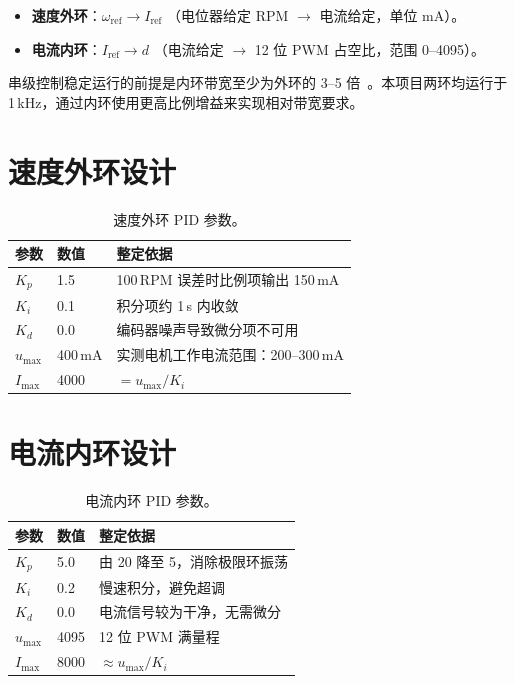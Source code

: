 \documentclass[12pt, a4paper]{ctexrep}
\begin{document}
\begin{itemize}
    \item \textbf{速度外环}：$\omega_{\text{ref}} \to I_{\text{ref}}$
    （电位器给定 RPM $\to$ 电流给定，单位 mA）。
    \item \textbf{电流内环}：$I_{\text{ref}} \to d$
    （电流给定 $\to$ 12 位 PWM 占空比，范围 0--4095）。
\end{itemize}

串级控制稳定运行的前提是内环带宽至少为外环的 3--5 倍~\cite{astrom2006}。本项目两环均运行于 1\,kHz，通过内环使用更高比例增益来实现相对带宽要求。

\section{速度外环设计}

\begin{table}[H]
    \centering
    \caption{速度外环 PID 参数。}
    \label{tab:speed_pid}
    \begin{tabular}{lll}
        \toprule
        \textbf{参数} & \textbf{数值} & \textbf{整定依据} \\
        \midrule
        $K_p$ & 1.5  & 100\,RPM 误差时比例项输出 150\,mA \\
        $K_i$ & 0.1  & 积分项约 1\,s 内收敛 \\
        $K_d$ & 0.0  & 编码器噪声导致微分项不可用 \\
        $u_{\max}$ & 400\,mA & 实测电机工作电流范围：200--300\,mA \\
        $I_{\max}$ & 4000    & $= u_{\max}/K_i$ \\
        \bottomrule
    \end{tabular}
\end{table}

\section{电流内环设计}

\begin{table}[H]
    \centering
    \caption{电流内环 PID 参数。}
    \label{tab:current_pid}
    \begin{tabular}{lll}
        \toprule
        \textbf{参数} & \textbf{数值} & \textbf{整定依据} \\
        \midrule
        $K_p$ & 5.0  & 由 20 降至 5，消除极限环振荡 \\
        $K_i$ & 0.2  & 慢速积分，避免超调 \\
        $K_d$ & 0.0  & 电流信号较为干净，无需微分 \\
        $u_{\max}$ & 4095 & 12 位 PWM 满量程 \\
        $I_{\max}$ & 8000 & $\approx u_{\max}/K_i$ \\
        \bottomrule
    \end{tabular}
\end{table}
\end{document}
